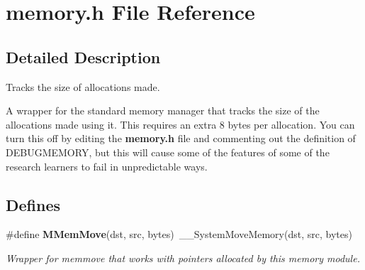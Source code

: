 \section{memory.h File Reference}
\label{memory_8h}


\subsection{Detailed Description}
Tracks the size of allocations made. 

A wrapper for the standard memory manager that tracks the size of the allocations made using it. This requires an extra 8 bytes per allocation. You can turn this off by editing the {\bf memory.h} file and commenting out the definition of DEBUGMEMORY, but this will cause some of the features of some of the research learners to fail in unpredictable ways.

\subsection*{Defines}
\begin{CompactItemize}
\item 
\#define {\bf MMem\-Move}(dst, src, bytes)\ \_\-\_\-System\-Move\-Memory(dst, src, bytes)
\begin{CompactList}\small\item\em Wrapper for memmove that works with pointers allocated by this memory module. \item\end{CompactList}\end{CompactItemize}
